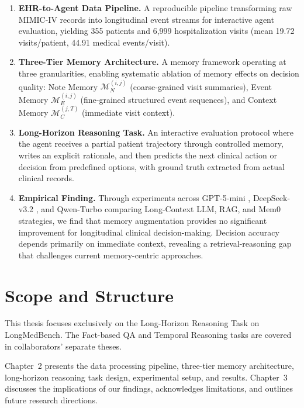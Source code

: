 \begin{enumerate}
    \item \textbf{EHR-to-Agent Data Pipeline.} A reproducible pipeline transforming raw MIMIC-IV \cite{PhysioNet-mimiciv-3.1} records into longitudinal event streams for interactive agent evaluation, yielding 355 patients and 6,999 hospitalization visits (mean 19.72 visits/patient, 44.91 medical events/visit).
    
    \item \textbf{Three-Tier Memory Architecture.} A memory framework operating at three granularities, enabling systematic ablation of memory effects on decision quality: Note Memory $\mathcal{M}^{(i,j)}_N$ (coarse-grained visit summaries), Event Memory $\mathcal{M}^{(i,j)}_E$ (fine-grained structured event sequences), and Context Memory $\mathcal{M}_C^{(j,T)}$ (immediate visit context).
    
    \item \textbf{Long-Horizon Reasoning Task.} An interactive evaluation protocol where the agent receives a partial patient trajectory through controlled memory, writes an explicit rationale, and then predicts the next clinical action or decision from predefined options, with ground truth extracted from actual clinical records.
    
    \item \textbf{Empirical Finding.} Through experiments across GPT-5-mini \cite{gpt52}, DeepSeek-v3.2 \cite{deepseekai2025deepseekv32}, and Qwen-Turbo \cite{qwen3} comparing Long-Context LLM, RAG, and Mem0 \cite{mem0_reference} strategies, we find that memory augmentation provides no significant improvement for longitudinal clinical decision-making. Decision accuracy depends primarily on immediate context, revealing a retrieval-reasoning gap that challenges current memory-centric approaches.
\end{enumerate}

\section{Scope and Structure}

This thesis focuses exclusively on the Long-Horizon Reasoning Task on LongMedBench. The Fact-based QA and Temporal Reasoning tasks are covered in collaborators' separate theses.

Chapter~2 presents the data processing pipeline, three-tier memory architecture, long-horizon reasoning task design, experimental setup, and results. Chapter~3 discusses the implications of our findings, acknowledges limitations, and outlines future research directions.
